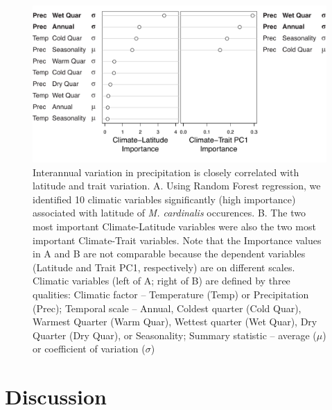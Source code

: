 \documentclass[11pt, oneside]{article}\usepackage[]{graphicx}\usepackage[]{color}
\begin{document}

\begin{figure}[h!]
	\centerline{\includegraphics[width=1\textwidth]{Figures/Figure_ClimVarImp.pdf}}
	\fontsize{10}{12}
	\selectfont
	\caption[Interannual variation in precipitation is closely correlated with latitude and trait variation]{Interannual variation in precipitation is closely correlated with latitude and trait variation. A. Using Random Forest regression, we identified 10 climatic variables significantly (high importance) associated with latitude of \textit{M. cardinalis} occurences. B. The two most important Climate-Latitude variables were also the two most important Climate-Trait variables. Note that the Importance values in A and B are not comparable because the dependent variables (Latitude and Trait PC1, respectively) are on different scales. Climatic variables (left of A; right of B) are defined by three qualities: Climatic factor -- Temperature (Temp) or Precipitation (Prec); Temporal scale -- Annual, Coldest quarter (Cold Quar), Warmest Quarter (Warm Quar), Wettest quarter (Wet Quar), Dry Quarter (Dry Quar), or Seasonality; Summary statistic -- average ($\mu$) or coefficient of variation ($\sigma$)}
	\label{fig:Fig_ClimVarImp}
\end{figure}


\section*{Discussion}
\end{document}
